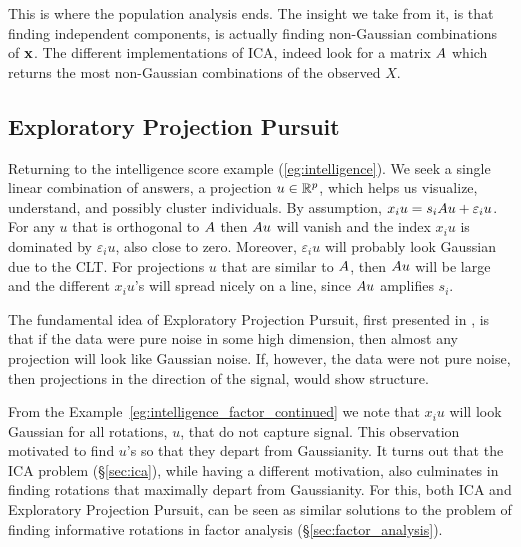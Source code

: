 This is where the population analysis ends. 
The insight we take from it, is that finding independent components, is actually finding non-Gaussian combinations of $\mathbf{x}$. 
The different implementations of ICA, indeed look for a matrix $A$ which returns the most non-Gaussian combinations of the observed $X$. 




\subsection{Exploratory Projection Pursuit}
\label{sec:exploratpory_ppr}


\begin{example}
\label{eg:intelligence_factor_continued}
Returning to the intelligence score example (\ref{eg:intelligence}).
We seek a single linear combination of answers, a projection $u \in \mathbb{R}^p$, which helps us visualize, understand, and possibly cluster individuals. 
By assumption, $x_i u = s_i A u + \varepsilon_i u$.
For any $u$ that is orthogonal to $A$ then $A u$ will vanish and the index $x_i u$ is dominated by $\varepsilon_i u$, also close to zero. Moreover, $\varepsilon_i u$ will probably look Gaussian due to the CLT.
For projections $u$ that are similar to $A$, then $A u$ will be large and the different $x_i u$'s will spread nicely on a line, since $A u$ amplifies $s_i$.
\end{example}


The fundamental idea of Exploratory Projection Pursuit, first presented in \cite{friedman_projection_1974}, is that if the data were pure noise in some high dimension, then almost any projection will look like Gaussian noise. 
If, however, the data were not pure noise, then projections in the direction of the signal, would show structure. 



\begin{remark}
From the Example~\ref{eg:intelligence_factor_continued} we note that $x_i u$ will look Gaussian for all rotations, $u$, that do not capture signal.
This observation motivated \citet{friedman_projection_1974} to find $u$'s so that they depart from Gaussianity. 
It turns out that the ICA problem (\S\ref{sec:ica}), while having a different motivation, also culminates in finding rotations that maximally depart from Gaussianity.
For this, both ICA and Exploratory Projection Pursuit, can be seen as similar solutions to the problem of finding informative rotations in factor analysis (\S\ref{sec:factor_analysis}).
\end{remark}



